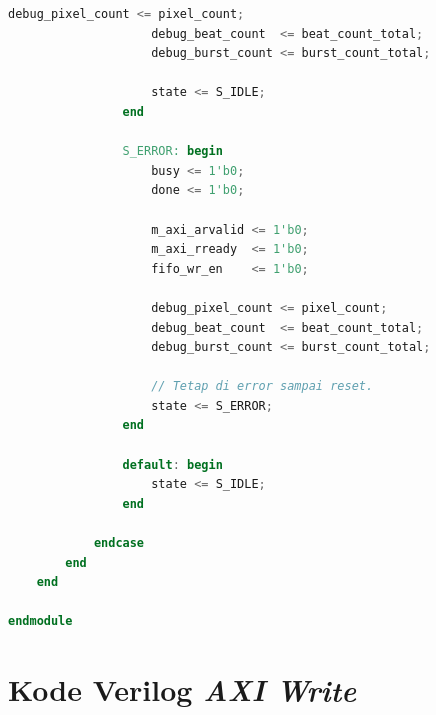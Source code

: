 \begin{lstlisting}[language=Verilog, title={Kode \emph{AXI Read} Yang akan mengisi \emph{FIFO VGA}}, label={code:verilog-axi-read}]
                    debug_pixel_count <= pixel_count;
                    debug_beat_count  <= beat_count_total;
                    debug_burst_count <= burst_count_total;

                    state <= S_IDLE;
                end

                S_ERROR: begin
                    busy <= 1'b0;
                    done <= 1'b0;

                    m_axi_arvalid <= 1'b0;
                    m_axi_rready  <= 1'b0;
                    fifo_wr_en    <= 1'b0;

                    debug_pixel_count <= pixel_count;
                    debug_beat_count  <= beat_count_total;
                    debug_burst_count <= burst_count_total;

                    // Tetap di error sampai reset.
                    state <= S_ERROR;
                end

                default: begin
                    state <= S_IDLE;
                end

            endcase
        end
    end

endmodule

	\end{lstlisting}

\section{Kode Verilog \emph{AXI Write}}

